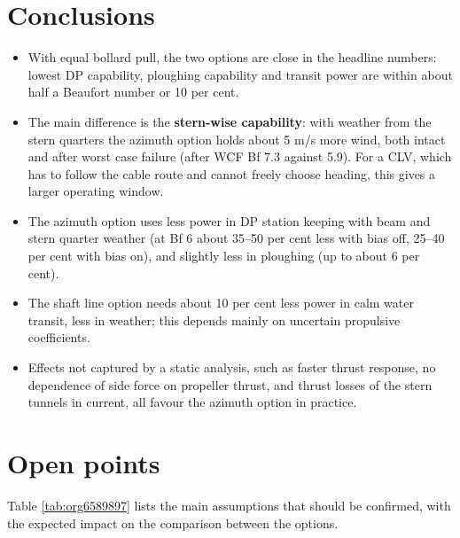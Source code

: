 \documentclass[a4paper,11pt]{article}
\begin{document}
\section{Conclusions}
\label{sec:org0e656b5}

\begin{itemize}
\item With equal bollard pull, the two options are close in the headline numbers: lowest
DP capability, ploughing capability and transit power are within about half a
Beaufort number or 10 per cent.
\item The main difference is the \textbf{stern-wise capability}: with weather from the stern
quarters the azimuth option holds about 5 m/s more wind, both intact and after worst
case failure (after WCF Bf 7.3 against 5.9).  For a CLV, which has to follow the
cable route and cannot freely choose heading, this gives a larger operating window.
\item The azimuth option uses less power in DP station keeping with beam and stern quarter
weather (at Bf 6 about 35--50 per cent less with bias off, 25--40 per cent with bias
on), and slightly less in ploughing (up to about 6 per cent).
\item The shaft line option needs about 10 per cent less power in calm water transit,
less in weather; this depends mainly on uncertain propulsive coefficients.
\item Effects not captured by a static analysis, such as faster thrust response, no
dependence of side force on propeller thrust, and thrust losses of the stern
tunnels in current, all favour the azimuth option in practice.
\end{itemize}

\section{Open points}
\label{sec:orgbd24a88}

Table \ref{tab:org6589897} lists the main assumptions that should be confirmed, with the
expected impact on the comparison between the options.
\end{document}
